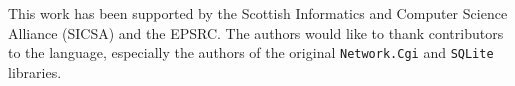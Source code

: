 \documentclass[preprint]{sigplanconf}
\begin{document}



\acks
This work has been supported by the Scottish Informatics and Computer Science Alliance (SICSA) and the EPSRC. The authors would like to thank contributors to the \idris{} language, especially the authors of the original \texttt{Network.Cgi} and \texttt{SQLite} libraries.






%
%
\end{document}
